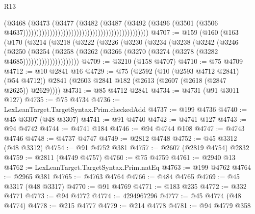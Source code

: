 \begin{lexlean}{R13}
\begin{coremodule}
                                                                                (@3468
                                                                                  (@3473
                                                                                    (@3477
                                                                                      (@3482
                                                                                        (@3487
                                                                                          (@3492
                                                                                            (@3496
                                                                                              (@3501
                                                                                                (@3506
                                                                                                  @4637)))))))))))))))))))))))))))))))))))))))))))))))
@4707 := @159
    (@160
      (@163
        (@170
          (@3214
            (@3218
              (@3222
                (@3226
                  (@3230
                    (@3234
                      (@3238
                        (@3242
                          (@3246
                            (@3250
                              (@3254
                                (@3258
                                  (@3262
                                    (@3266 (@3270 (@3274 (@3278 (@3282 @4685)))))))))))))))))))))
@4709 := @3210 (@158 @4707)
@4710 := @75 @4709
@4712 := @10 @2841 @16
@4729 := @75
    (@2592
      (@10 (@2593 @4712 @2841) (@54 @4712))
      @2841
      (@2603 @2841 @182 (@2613 (@2607 (@2618 (@2847 @2625)) @2629))))
@4731 := @85 @4712 @2841
@4734 := @4731 (@91 @3011 @127)
@4735 := @75 @4734
@4736 := LexLeanTarget.TargetSyntax.Prim.checkedAdd
@4737 := @199 @4736
@4740 := @45 @3307 (@48 @3307)
@4741 := @91 @4740
@4742 := @4741 @127
@4743 := @94 @4742
@4744 := @4741 @184
@4746 := @94 @4744 @108
@4747 := @4743 @4746
@4748 := @4737 @4747
@4749 := @2812 @4748
@4752 := @45 @3312 (@48 @3312)
@4754 := @91 @4752 @381
@4757 := @2607 (@2819 @4754) @2832
@4759 := @2811 (@4749 @4757)
@4760 := @75 @4759
@4761 := @2940 @13
@4762 := LexLeanTarget.TargetSyntax.Prim.natEq
@4763 := @199 @4762
@4764 := @2965 @381
@4765 := @4763 @4764
@4766 := @484 @4765
@4769 := @45 @3317 (@48 @3317)
@4770 := @91 @4769
@4771 := @183 @235
@4772 := @332 @4771
@4773 := @94 @4772
@4774 := 4294967296
@4777 := @45 @4774 (@48 @4774)
@4778 := @215 @4777
@4779 := @214 @4778
@4781 := @94 @4779 @358

\end{coremodule}
\end{lexlean}

